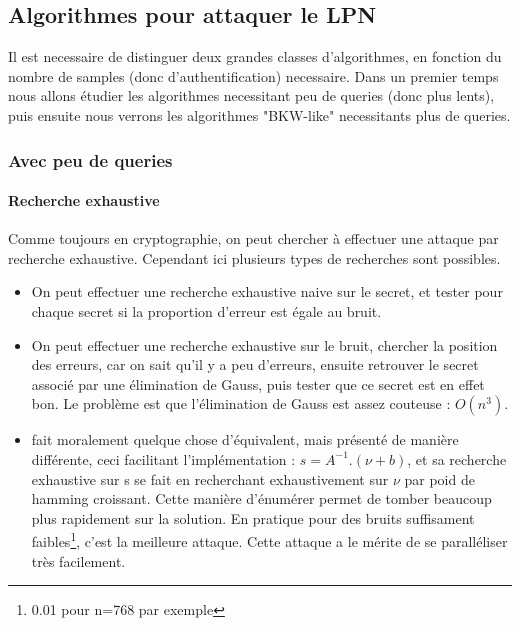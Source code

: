 \documentclass{article}		%
\theoremstyle{definition}
\theoremstyle{plain}
\begin{document}
\subsection{Algorithmes pour attaquer le LPN}
Il est necessaire de distinguer deux grandes classes
d'algorithmes, en fonction du nombre de samples (donc d'authentification)
necessaire. Dans un premier temps nous allons étudier les algorithmes
necessitant peu de queries (donc plus lents), puis ensuite nous verrons
les algorithmes "BKW-like" necessitants plus de queries.


\subsubsection{Avec peu de queries}
\paragraph{Recherche exhaustive}
Comme toujours en cryptographie, on peut chercher à effectuer une attaque
par recherche exhaustive. Cependant ici plusieurs types de recherches sont
possibles.
\begin{itemize}
\item On peut effectuer une recherche exhaustive naive sur le
secret, et tester pour chaque secret si la proportion d'erreur est égale
au bruit.
\item On peut effectuer une recherche exhaustive sur le bruit, chercher
la position des erreurs, car on sait qu'il y a peu d'erreurs, ensuite
retrouver le secret associé par une élimination de Gauss, puis tester que
ce secret est en effet bon. Le problème est que l'élimination de Gauss
est assez couteuse : $O(n^3)$.
\item \cite{Gol} fait moralement quelque chose d'équivalent, mais
présenté de manière différente, ceci facilitant l'implémentation :
$s=A^{-1}.(\nu+b)$, et sa recherche
exhaustive sur s se fait en recherchant exhaustivement sur $\nu$ par poid
de hamming croissant. Cette manière d'énumérer permet de tomber beaucoup
plus rapidement sur la solution. En pratique pour des bruits suffisament
faibles\footnote{0.01 pour n=768 par exemple}, c'est la meilleure attaque. Cette attaque a
le mérite de se paralléliser très facilement. 
\end{itemize} 
\end{document}
